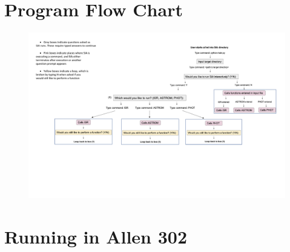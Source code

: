 \documentclass[11pt]{report}
\begin{document}
\section{Program Flow Chart}
\begin{figure}[h!]
\begin{center}
\includegraphics[width=1.3\textwidth,center]{SIA_flow_chart.pdf}
\end{center}
\end{figure}


\section{Running in Allen 302}
\end{document}
